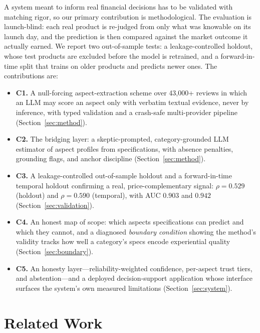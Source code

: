 \documentclass[journal]{IEEEtran}
\begin{document}
A system meant to inform real financial decisions has to be validated with matching rigor, so our primary contribution is methodological. The evaluation is launch-blind: each real product is re-judged from only what was knowable on its launch day, and the prediction is then compared against the market outcome it actually earned. We report two out-of-sample tests: a leakage-controlled holdout, whose test products are excluded before the model is retrained, and a forward-in-time split that trains on older products and predicts newer ones. The contributions are:

\begin{itemize}
\item \textbf{C1.} A null-forcing aspect-extraction scheme over 43{,}000+ reviews in which an LLM may score an aspect only with verbatim textual evidence, never by inference, with typed validation and a crash-safe multi-provider pipeline (Section~\ref{sec:method}).
\item \textbf{C2.} The bridging layer: a skeptic-prompted, category-grounded LLM estimator of aspect profiles from specifications, with absence penalties, grounding flags, and anchor discipline (Section~\ref{sec:method}).
\item \textbf{C3.} A leakage-controlled out-of-sample holdout and a forward-in-time temporal holdout confirming a real, price-complementary signal: $\rho = 0.529$ (holdout) and $\rho = 0.590$ (temporal), with AUC $0.903$ and $0.942$ (Section~\ref{sec:validation}).
\item \textbf{C4.} An honest map of scope: which aspects specifications can predict and which they cannot, and a diagnosed \emph{boundary condition} showing the method's validity tracks how well a category's specs encode experiential quality (Section~\ref{sec:boundary}).
\item \textbf{C5.} An honesty layer---reliability-weighted confidence, per-aspect trust tiers, and abstention---and a deployed decision-support application whose interface surfaces the system's own measured limitations (Section~\ref{sec:system}).
\end{itemize}

\section{Related Work}
\label{sec:related}
\end{document}
